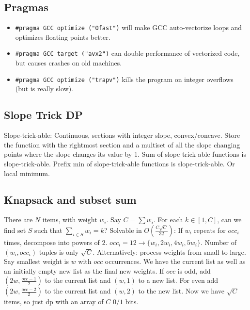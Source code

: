 	\subsection{Pragmas}
		\begin{itemize}
			\item \lstinline{#pragma GCC optimize ("Ofast")} will make GCC auto-vectorize loops and optimizes floating points better.
			\item \lstinline{#pragma GCC target ("avx2")} can double performance of vectorized code, but causes crashes on old machines.
			\item \lstinline{#pragma GCC optimize ("trapv")} kills the program on integer overflows (but is really slow).
		\end{itemize}

	\subsection{Slope Trick DP}
	Slope-trick-able: Continuous, sections with integer slope, convex/concave.
	Store the function with the rightmost section and a multiset of all the slope changing points where the slope changes its value by 1.
	Sum of slope-trick-able functions is slope-trick-able.
	Prefix min of slope-trick-able functions is slope-trick-able. Or local minimum.
	\subsection{Knapsack and subset sum}
	There are $N$ items, with weight $w_i$. Say $C=\sum w_i$. For each $k\in [1,C]$, can we find set $S$ such that $\sum_{i\in S}w_i=k$?
	Solvable in $O(\frac{C\sqrt{C}}{32})$: If $w_i$ repeats for $occ_i$ times, decompose into powers of $2$.
	$occ_i=12 \to \{w_i, 2w_i, 4w_i, 5w_i\}$. Number of $(w_i, occ_i)$ tuples is only $\sqrt{C}$.
	Alternatively: process weights from small to large. Say smallest weight is $w$ with $occ$ occurrences. 
	We have the current list as well as an initially empty new list as the final new weights.
	If $occ$ is odd, add $(2w, \frac{occ-1}{2})$ to the current list and $(w, 1)$ to a new list. 
	For even add $(2w, \frac{occ-2}{2})$ to the current list and $(w, 2)$ to the new list.
	Now we have $\sqrt{C}$ items, so just dp with an array of $C$ $0/1$ bits.
